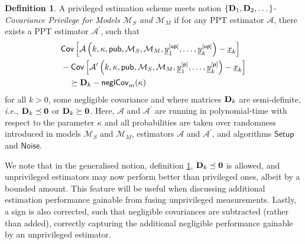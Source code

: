 \documentclass[conference]{IEEEtran}
\theoremstyle{definition}
\newtheorem{definition}{Definition}[section]
\theoremstyle{remark}
\begin{document}
\begin{definition}\label{def:cov_priv_security_notion}
  A privileged estimation scheme meets notion \textit{$\{{{\mathbf{D}}}_1,{{\mathbf{D}}}_2,\dots\}$-Covariance Privilege for Models $\mathcal{M}_S$ and $\mathcal{M}_M$} if for any PPT estimator $\mathcal{A}$, there exists a PPT estimator $\mathcal{A}^\prime$, such that
  \begin{equation}
    \begin{split}
      &\mathsf{Cov}\left[\mathcal{A}\left(k,\kappa,\mathsf{pub},\mathcal{M}_S,\mathcal{M}_M,{\underline{y}}^{[\mathsf{up}]}_1,\dots,{\underline{y}}^{[\mathsf{up}]}_k\right) - {\underline{x}}_k\right]\\
      &-\mathsf{Cov}\left[\mathcal{A}^\prime\left(k,\kappa,\mathsf{pub},\mathcal{M}_S,\mathcal{M}_M,{\underline{y}}^{[\mathsf{p}]}_1,\dots,{\underline{y}}^{[\mathsf{p}]}_k\right) - {\underline{x}}_k\right]\\
      &\quad\succeq {\ensuremath{{\mathbf{D}}}}_k - \mathsf{neglCov}_m(\kappa)
    \end{split}
  \end{equation}
  for all $k>0$, some negligible covariance and where matrices ${{\mathbf{D}}}_k$ are semi-definite, \textit{i.e.}, ${{\mathbf{D}}}_k \preceq {\ensuremath{{\mathbf{0}}}}$ or ${{\mathbf{D}}}_k \succeq {\ensuremath{{\mathbf{0}}}}$. Here, $\mathcal{A}$ and $\mathcal{A}^\prime$ are running in polynomial-time with respect to the parameter $\kappa$ and all probabilities are taken over randomness introduced in models $\mathcal{M}_S$ and $\mathcal{M}_M$, estimators $\mathcal{A}$ and $\mathcal{A}^\prime$, and algorithms $\mathsf{Setup}$ and $\mathsf{Noise}$.
\end{definition}

We note that in the generalised notion, definition \ref{def:cov_priv_security_notion}, ${{\mathbf{D}}}_k\preceq {\ensuremath{{\mathbf{0}}}}$ is allowed, and unprivileged estimators may now perform better than privileged ones, albeit by a bounded amount. This feature will be useful when discussing additional estimation performance gainable from fusing unprivileged measurements. Lastly, a sign is also corrected, such that negligible covariances are subtracted (rather than added), correctly capturing the additional negligible performance gainable by an unprivileged estimator.

% 
%                                                                      
%                                                                      
%                                                                      
% 
\end{document}
